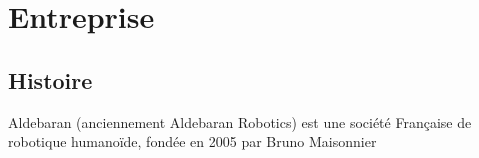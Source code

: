 \chapter*{Entreprise}
\thispagestyle{fancy}

\section{Histoire}
Aldebaran (anciennement Aldebaran Robotics) est une société Française de robotique humanoïde, fondée en 2005 par Bruno Maisonnier